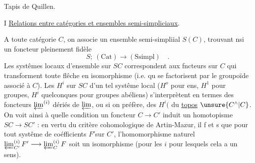 
Tapis de Quillen.

I \quad \uline{Relations entre catégories et ensembles semi-simpliciaux}.

A toute catégorie $C$, on associe un ensemble semi-simpliial $S(C)$,
trouvant nsi un foncteur pleinement fidèle 
\[
S;\ (\mathrm{Cat}) \longrightarrow (\mathrm{Ssimpl}) \quad .
\]
 Les systêmes locaux d'ensemble sur $SC$ correspondent
aux fncteurs sur $C$ qui transforment toute flêche en isomorphisme (i.e.
qu se factorisent par le groupoïde associé à $C$). Les $H^i$ sur $SC$ d'un tel
systême local ($H^o$ pour ens, $H^1$ pour groupes, $H^i$ quelconques pour groupes
abéliens) s'interprètent en termes des foncteurs $\varprojlim^{(i)}$ dériés de $\varprojlim$,
ou si on préfère, des $H^i($ du \uline{topos} $\unsure{C^{\wedge}|C}$. On voit ainsi à quelle condition
un foncteur $C\longrightarrow C'$ induit un homotopisme $SC\longrightarrow SC'$ : en vertu du
critère cohomologique de Artin-Mazur, il f et s que pour tout systême
de coéfficients $F'$sur $C'$, l'homomorphisme naturel $\varprojlim_{C'}^{(i)}F'\longrightarrow\varprojlim_C^{(i)}F$
soit un isomorphisme (pour les $i$ pour lesquels cela a un sens). 

